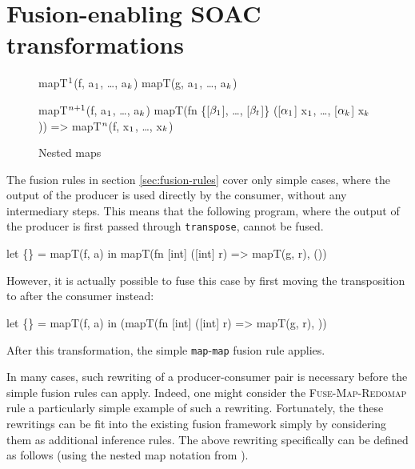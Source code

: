 \chapter{Fusion-enabling SOAC transformations}
\label{chap:fusion-enabling-soac-transformations}

\begin{figure}
\begin{center}
\begin{colorcode}
mapT\(^{1}\)(f, a\(_{1}\), \ldots , a\(_{k}\)) \emphh{\(\equiv\)}
mapT(g, a\(_{1}\), \ldots, a\(_{k}\))

mapT\(^{n+1}\)(f, a\(_{1}\), \ldots, a\(_{k}\)) \emphh{\(\equiv\)}
mapT(fn \{[\(\beta_{1}\)], \ldots, [\(\beta_{t}\)]\} ([\(\alpha_{1}\)] x\(_{1}\), \ldots, [\(\alpha_{k}\)] x\(_{k}\))) =>
       mapT\(^{n}\)(f, x\(_{1}\), \ldots, x\(_{k}\))
\end{colorcode}
\end{center}
\caption{Nested maps}
\label{fig:nested-maps}
\end{figure}

The fusion rules in section \ref{sec:fusion-rules} cover only simple
cases, where the output of the producer is used directly by the
consumer, without any intermediary steps.  This means that the
following program, where the output of the producer is first passed
through \texttt{transpose}, cannot be fused.
\begin{colorcode}
let \{\} = mapT(f, a) in
mapT(fn [int] ([int] r) => mapT(g, r), ())
\end{colorcode}
However, it is actually possible to fuse this case by first moving the
transposition to after the consumer instead:
\begin{colorcode}
let \{\} = mapT(f, a) in
(mapT(fn [int] ([int] r) => mapT(g, r), ))
\end{colorcode}
After this transformation, the simple \texttt{map}-\texttt{map} fusion
rule applies.

In many cases, such rewriting of a producer-consumer pair is necessary
before the simple fusion rules can apply.  Indeed, one might consider
the \textsc{Fuse-Map-Redomap} rule a particularly simple example of
such a rewriting.  Fortunately, the these rewritings can be fit into
the existing fusion framework simply by considering them as additional
inference rules.  The above rewriting specifically can be defined as
follows (using the nested map notation from ).

